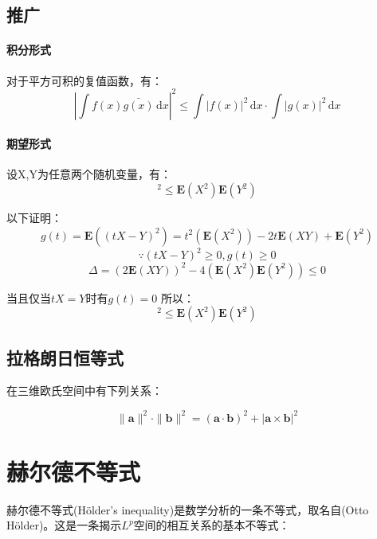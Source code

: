 \documentclass[a4paper]{article} %
\numberwithin{equation}{section} %
\newcommand{\ud}{\,\mathrm{d}}
\begin{document}
\subsection{推广}
\paragraph{积分形式}
对于平方可积的复值函数，有：
$$
\left|\int f(x)\bar{g(x)}\ud x\right|^2\le \int |f(x)|^2\ud x\cdot\int |g(x)|^2\ud x
$$

\paragraph{期望形式}
设X,Y为任意两个随机变量，有：
\begin{equation}
[\mathbf E(XY)]^2\le \mathbf E(X^2)\mathbf E(Y^2)
\end{equation}

以下证明：
\begin{equation}
g(t)= \mathbf E((tX-Y)^2)=t^2(\mathbf E(X^2))-2t\mathbf E(XY)+\mathbf E(Y^2)
\end{equation}
\begin{equation}
\because (tX-Y)^2\ge 0,g(t)\ge 0
\end{equation}
\begin{equation}
\Delta=(2\mathbf E(XY))^2-4(\mathbf E(X^2)\mathbf E(Y^2))\le 0
\end{equation}

当且仅当$tX=Y$时有$g(t)=0$
所以：
\begin{equation}
[\mathbf E(XY)]^2\le \mathbf E(X^2)\mathbf E(Y^2)
\end{equation}

\subsection{拉格朗日恒等式}
在三维欧氏空间中有下列关系：

\begin{equation}
\|{\mathbf  a}\|^{2}\cdot \|{\mathbf  b}\|^{2}=({\mathbf  {a\cdot b}})^{2}+|\mathbf a\times\mathbf  b|^2
\end{equation}

\section{赫尔德不等式}

赫尔德不等式(H\"{o}lder's inequality)是数学分析的一条不等式，取名自(Otto H\"{o}lder)。这是一条揭示$L^p$空间的相互关系的基本不等式：
\end{document}
